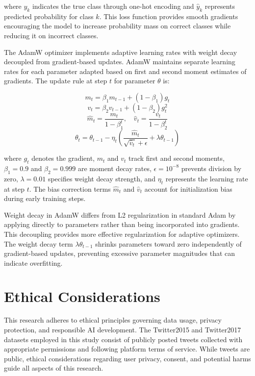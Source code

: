 \documentclass[12pt,a4paper]{report}
\begin{document}
where $y_k$ indicates the true class through one-hot encoding and $\hat{y}_k$ represents predicted probability for class $k$. This loss function provides smooth gradients encouraging the model to increase probability mass on correct classes while reducing it on incorrect classes.

The AdamW optimizer implements adaptive learning rates with weight decay decoupled from gradient-based updates. AdamW maintains separate learning rates for each parameter adapted based on first and second moment estimates of gradients. The update rule at step $t$ for parameter $\theta$ is:

\begin{equation}
m_t = \beta_1 m_{t-1} + (1-\beta_1) g_t
\end{equation}
\begin{equation}
v_t = \beta_2 v_{t-1} + (1-\beta_2) g_t^2
\end{equation}
\begin{equation}
\hat{m}_t = \frac{m_t}{1-\beta_1^t}, \quad \hat{v}_t = \frac{v_t}{1-\beta_2^t}
\end{equation}
\begin{equation}
\theta_t = \theta_{t-1} - \eta_t \left(\frac{\hat{m}_t}{\sqrt{\hat{v}_t} + \epsilon} + \lambda \theta_{t-1}\right)
\end{equation}

where $g_t$ denotes the gradient, $m_t$ and $v_t$ track first and second moments, $\beta_1=0.9$ and $\beta_2=0.999$ are moment decay rates, $\epsilon=10^{-8}$ prevents division by zero, $\lambda=0.01$ specifies weight decay strength, and $\eta_t$ represents the learning rate at step $t$. The bias correction terms $\hat{m}_t$ and $\hat{v}_t$ account for initialization bias during early training steps.

Weight decay in AdamW differs from L2 regularization in standard Adam by applying directly to parameters rather than being incorporated into gradients. This decoupling provides more effective regularization for adaptive optimizers. The weight decay term $\lambda \theta_{t-1}$ shrinks parameters toward zero independently of gradient-based updates, preventing excessive parameter magnitudes that can indicate overfitting.

\section{Ethical Considerations}

This research adheres to ethical principles governing data usage, privacy protection, and responsible AI development. The Twitter2015 and Twitter2017 datasets employed in this study consist of publicly posted tweets collected with appropriate permissions and following platform terms of service. While tweets are public, ethical considerations regarding user privacy, consent, and potential harms guide all aspects of this research.
\end{document}
